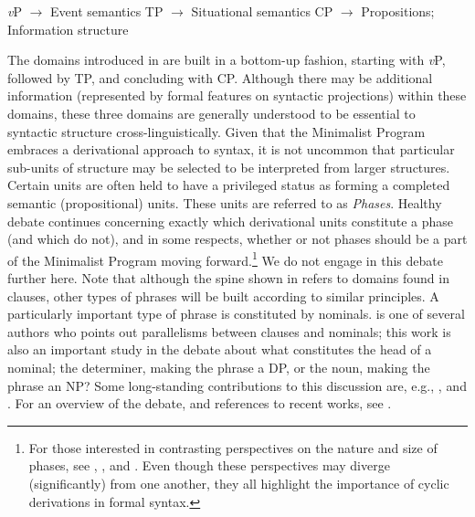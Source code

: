 \documentclass[output=paper,colorlinks,citecolor=brown]{langscibook}
\begin{document}
\ea \label{triple}
\ea \textit{v}P $\rightarrow$ Event semantics
\ex TP $\rightarrow$ Situational semantics 
\ex CP $\rightarrow$ Propositions; Information structure
\z
\z

The domains introduced in  are built in a bottom-up fashion, starting with \textit{v}P, followed by TP, and concluding with CP. Although there may be additional information (represented by formal features on syntactic projections) within these domains, these three domains are generally understood to be essential to syntactic structure cross-linguistically. Given that the Minimalist Program embraces a derivational approach to syntax, it is not uncommon that particular sub-units of structure may be selected to be interpreted from larger structures. Certain units are often held to have a privileged status as forming a completed semantic (propositional) units. These units are referred to as \emph{Phases}. Healthy debate continues concerning exactly which derivational units constitute a phase (and which do not), and in some respects, whether or not phases should be a part of the Minimalist Program moving forward.\footnote{For those interested in contrasting perspectives on the nature and size of phases, see \citet{abels12}, \citet{epseely06}, \citet{stroikput13} and \citet{boskovic2014phases}. Even though these perspectives may diverge (significantly) from one another, they all highlight the importance of cyclic derivations in formal syntax.} We do not engage in this debate further here. Note that although the spine shown in  refers to domains  found in clauses, other types of phrases will be built according to similar principles. A particularly important type of phrase is constituted by nominals. \citet{abney1987englishNP} is one of several authors who points out parallelisms between clauses and nominals; this work is also an important study in the debate about what constitutes the head of a nominal; the determiner, making the phrase a DP, or the noun, making the phrase an NP? Some long-standing contributions to this discussion are, e.g., \citet{Longobardi2010}, \citet{szabolcsi1994} and \citet{boscovic2005}.  For an overview of the debate, and references to recent works, see \citet{blumelholler2022newperspectives}.
\end{document}
